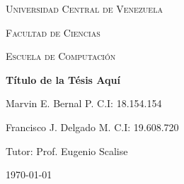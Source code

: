 \begin{titlepage}
	\centering
	{\scshape\LARGE Universidad Central de Venezuela\par}
	{\scshape\LARGE Facultad de Ciencias\par}
	{\scshape\LARGE Escuela de Computación\par}


	\vspace*{\fill}
	{\huge\bfseries Título de la Tésis Aquí\par}
	\vspace*{\fill}
	
	{\large Marvin E. Bernal P. C.I: 18.154.154\par}
	{\large Francisco J. Delgado M. C.I: 19.608.720\par}
	{\large Tutor: Prof. Eugenio Scalise\par}
	\vspace{1cm}
	{\large \today\par}
\end{titlepage}